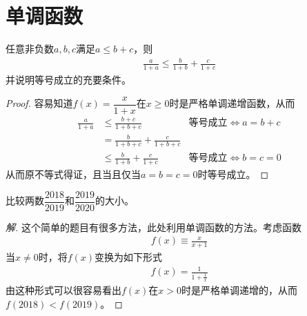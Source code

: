 
\chapter{单调函数}
\label{chap:monotonic-functions}

\begin{example}
  任意非负数$a,b,c$满足$a\le b+c$，则
  \begin{align*}
    \frac{a}{1+a}\le \frac{b}{1+b} + \frac{c}{1+c}
  \end{align*}
  并说明等号成立的充要条件。
\end{example}
\begin{proof}
  容易知道$f(x)=\dfrac{x}{1+x}$在$x\ge0$时是严格单调递增函数，从而
  \begin{align*}
    \frac{a}{1+a}&\le\frac{b+c}{1+b+c}&\text{等号成立}\iff a=b+c\\
    &=\frac{b}{1+b+c} + \frac{c}{1+b+c}\\
    &\le\frac{b}{1+b} + \frac{c}{1+c}&\text{等号成立}\iff b=c=0
  \end{align*}
  从而原不等式得证，且当且仅当$a=b=c=0$时等号成立。
\end{proof}

\begin{example}
  比较两数$\dfrac{2018}{2019}$和$\dfrac{2019}{2020}$的大小。
\end{example}
\begin{proof}[解]
  这个简单的题目有很多方法，此处利用单调函数的方法。考虑函数
  \begin{align*}
    f(x)\equiv \frac{x}{x+1}
  \end{align*}
  当$x\ne0$时，将$f(x)$变换为如下形式
  \begin{align*}
    f(x) = \frac1{1+\frac1x}
  \end{align*}
  由这种形式可以很容易看出$f(x)$在$x>0$时是严格单调递增的，从而$f(2018)<f(2019)$。
\end{proof}
